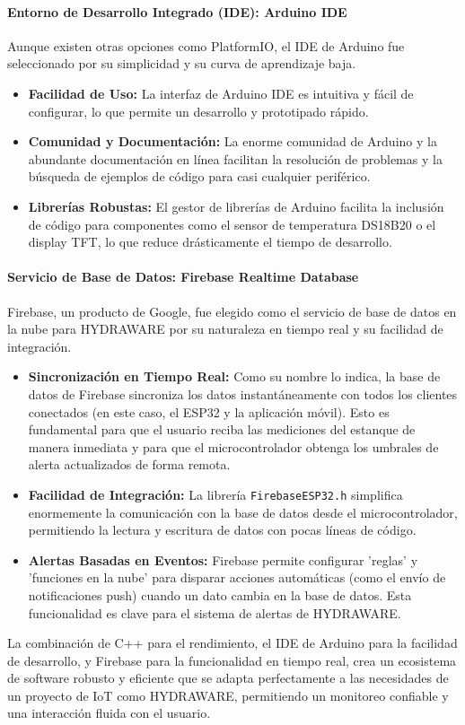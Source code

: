 \documentclass[a4paper,12pt]{article}
\begin{document}
	\paragraph{Entorno de Desarrollo Integrado (IDE): Arduino IDE}
	Aunque existen otras opciones como PlatformIO, el IDE de Arduino fue seleccionado por su simplicidad y su curva de aprendizaje baja.
	\begin{itemize}
		\item \textbf{Facilidad de Uso:} La interfaz de Arduino IDE es intuitiva y fácil de configurar, lo que permite un desarrollo y prototipado rápido.
		\item \textbf{Comunidad y Documentación:} La enorme comunidad de Arduino y la abundante documentación en línea facilitan la resolución de problemas y la búsqueda de ejemplos de código para casi cualquier periférico.
		\item \textbf{Librerías Robustas:} El gestor de librerías de Arduino facilita la inclusión de código para componentes como el sensor de temperatura DS18B20 o el display TFT, lo que reduce drásticamente el tiempo de desarrollo.
	\end{itemize}
	
	\paragraph{Servicio de Base de Datos: Firebase Realtime Database}
	Firebase, un producto de Google, fue elegido como el servicio de base de datos en la nube para HYDRAWARE por su naturaleza en tiempo real y su facilidad de integración.
	\begin{itemize}
		\item \textbf{Sincronización en Tiempo Real:} Como su nombre lo indica, la base de datos de Firebase sincroniza los datos instantáneamente con todos los clientes conectados (en este caso, el ESP32 y la aplicación móvil). Esto es fundamental para que el usuario reciba las mediciones del estanque de manera inmediata y para que el microcontrolador obtenga los umbrales de alerta actualizados de forma remota.
		\item \textbf{Facilidad de Integración:} La librería \texttt{FirebaseESP32.h} simplifica enormemente la comunicación con la base de datos desde el microcontrolador, permitiendo la lectura y escritura de datos con pocas líneas de código.
		\item \textbf{Alertas Basadas en Eventos:} Firebase permite configurar 'reglas' y 'funciones en la nube' para disparar acciones automáticas (como el envío de notificaciones push) cuando un dato cambia en la base de datos. Esta funcionalidad es clave para el sistema de alertas de HYDRAWARE.
	\end{itemize}
	
	La combinación de C++ para el rendimiento, el IDE de Arduino para la facilidad de desarrollo, y Firebase para la funcionalidad en tiempo real, crea un ecosistema de software robusto y eficiente que se adapta perfectamente a las necesidades de un proyecto de IoT como HYDRAWARE, permitiendo un monitoreo confiable y una interacción fluida con el usuario.
	
	
\end{document}
